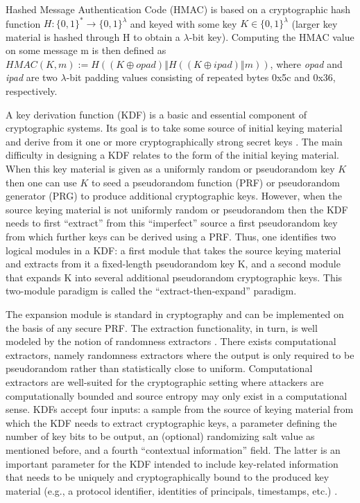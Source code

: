 Hashed Message Authentication Code (HMAC) \cite{rfc2104} is based on a cryptographic hash function $H : \{0, 1\}^* \rightarrow \{0, 1\}^\lambda$ and keyed with some key $K \in \{0, 1\}^\lambda$ (larger key material is hashed through H to obtain a $\lambda$-bit key). Computing the HMAC value on some message m is then defined as $\textit{HMAC}(K, m) := H((K \oplus \textit{opad}) \mathbin\Vert H((K \oplus \textit{ipad}) \mathbin\Vert m))$, where \textit{opad} and \textit{ipad} are two $\lambda$-bit padding values consisting of repeated bytes 0x5c and 0x36, respectively.

A key derivation function (KDF) is a basic and essential component of cryptographic systems.  Its goal is to take some source of initial keying material and derive from it one or more cryptographically strong secret keys \cite{hdkf}. The main difficulty in designing a KDF relates to the form of the initial keying material. When this key material is given as a uniformly random or pseudorandom key $K$ then one can use $K$ to seed a pseudorandom function (PRF) or pseudorandom generator (PRG) to produce additional cryptographic keys. However, when the source keying material is not uniformly random or pseudorandom then the KDF needs to first ``extract'' from this ``imperfect'' source a first pseudorandom key from which further keys can be derived using a PRF. Thus, one identifies two logical modules in a KDF: a first module that takes the source keying material and extracts from it a fixed-length pseudorandom key K, and a second module that expands K into several additional pseudorandom cryptographic keys. This two-module paradigm is called the ``extract-then-expand'' paradigm. 

The expansion module is standard in cryptography and can be implemented on the basis of any secure PRF. The extraction functionality, in turn, is well modeled by the notion of randomness extractors \cite{hdkf}. There exists computational extractors, namely randomness extractors where the output is only required to be pseudorandom rather than statistically close to uniform. Computational extractors are well-suited for the cryptographic setting where attackers are computationally bounded and source entropy may only exist in a computational sense. KDFs accept four inputs: a sample from the source of keying material from which the KDF needs to extract cryptographic keys, a parameter defining the number of key bits to be output, an (optional) randomizing salt value as mentioned before, and a fourth ``contextual information'' field. The latter is an important parameter for the KDF intended to include key-related information that needs to be uniquely and cryptographically bound to the produced key material (e.g., a protocol identifier, identities of principals, timestamps, etc.) \cite{hdkf}. 

